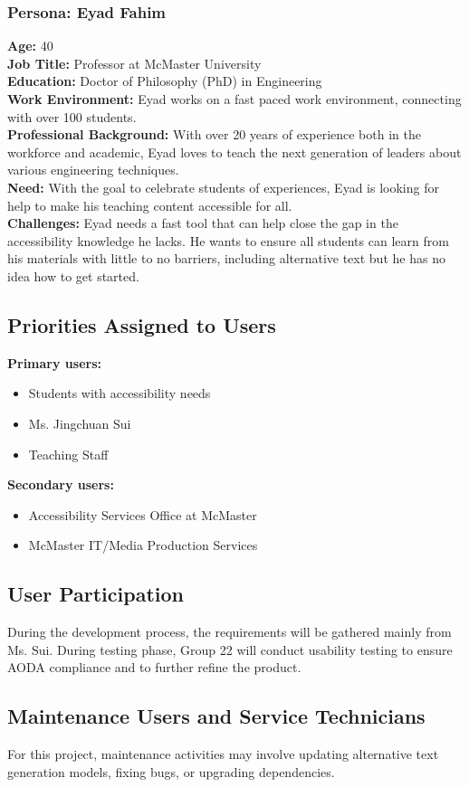 \documentclass[12pt]{article}
\begin{document}
\subsubsection*{Persona: Eyad Fahim}
\textbf{Age:} 40 \\
\textbf{Job Title:} Professor at McMaster University\\
\textbf{Education:} Doctor of Philosophy (PhD) in Engineering\\
\textbf{Work Environment:} Eyad works on a fast paced work
environment, connecting with over 100 students.\\
\textbf{Professional Background:} With over 20 years of experience both in
the workforce and academic, Eyad loves to teach the next generation
of leaders about various engineering techniques.\\[2mm]
\textbf{Need:} With the goal to
celebrate students of experiences, Eyad is looking for help to make
his teaching content accessible for all.\\
\textbf{Challenges:} Eyad needs a fast tool that can help close the gap in the
accessibility knowledge he lacks. He wants to ensure all students can
learn from his materials with little to no barriers, including
alternative text but he has no idea how to get started.
\subsection{Priorities Assigned to Users}
\textbf{Primary users:}
\begin{itemize}
  \item Students with accessibility needs
  \item Ms. Jingchuan Sui
  \item Teaching Staff
\end{itemize}
\textbf{Secondary users:}
\begin{itemize}
  \item Accessibility Services Office at McMaster
  \item McMaster IT/Media Production Services
\end{itemize}
\subsection{User Participation}
During the development process, the requirements will be gathered
mainly from Ms. Sui. During testing phase, Group 22 will conduct
usability testing to ensure AODA compliance and to further refine the product.
\subsection{Maintenance Users and Service Technicians}
For this project, maintenance activities may involve updating
alternative text generation models, fixing bugs, or upgrading dependencies.
\end{document}
